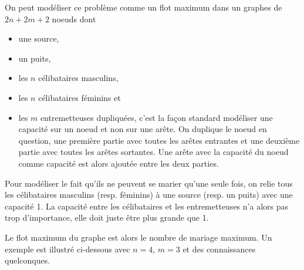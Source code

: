 \begin{solution}
  On peut modéliser ce problème comme un flot maximum dans un graphes de $2n + 2m + 2$ noeuds dont
  \begin{itemize}
    \item une source,
    \item un puits,
    \item les $n$ célibataires masculins,
    \item les $n$ célibataires féminins et
    \item les $m$ entremetteuses dupliquées,
      c'est la façon standard modéliser une capacité sur un noeud et non sur une arête.
      On duplique le noeud en question, une première partie avec toutes les arêtes entrantes
      et une deuxième partie avec toutes les arêtes sortantes.
      Une arête avec la capacité du noeud comme capacité est alors ajoutée entre les deux parties.
  \end{itemize}
  Pour modéliser le fait qu'ils ne peuvent se marier qu'une seule fois, on relie tous les célibataires
  masculins (resp. féminins) à une source (resp. un puits) avec une capacité 1.
  La capacité entre les célibataires et les entremetteuses n'a alors pas trop d'importance,
  elle doit juste être plus grande que 1.

  Le flot maximum du graphe est alors le nombre de mariage maximum.
  Un exemple est illustré ci-dessous avec $n = 4$, $m = 3$ et des connaissances quelconques.
  \begin{center}
  \end{center}
\end{solution}

